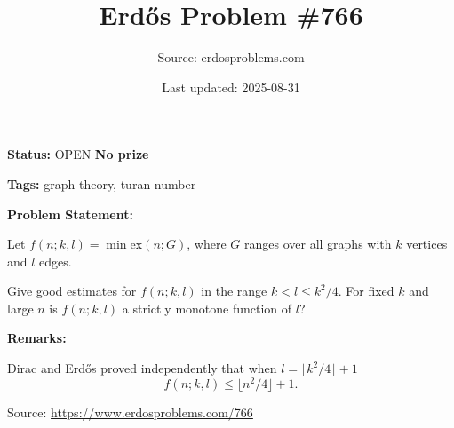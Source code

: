 \documentclass{article}
\title{Erd\H{o}s Problem \#766}
\date{Last updated: 2025-08-31}
\author{Source: erdosproblems.com}
\begin{document}
\maketitle

\noindent\textbf{Status:} OPEN \quad \textbf{No prize}

\noindent\textbf{Tags:} graph theory, turan number

\medskip
\noindent\textbf{Problem Statement:}

Let $f(n;k,l)=\min \mathrm{ex}(n;G)$, where $G$ ranges over all graphs with $k$ vertices and $l$ edges.

Give good estimates for $f(n;k,l)$ in the range $k<l\leq k^2/4$. For fixed $k$ and large $n$ is $f(n;k,l)$ a strictly monotone function of $l$?

\bigskip
\noindent\textbf{Remarks:}

Dirac and Erd\H{o}s proved independently that when $l=\lfloor k^2/4\rfloor+1$\[f(n;k,l)\leq \lfloor n^2/4\rfloor+1.\]

\bigskip
\noindent\small{Source: \url{https://www.erdosproblems.com/766}}
\end{document}
